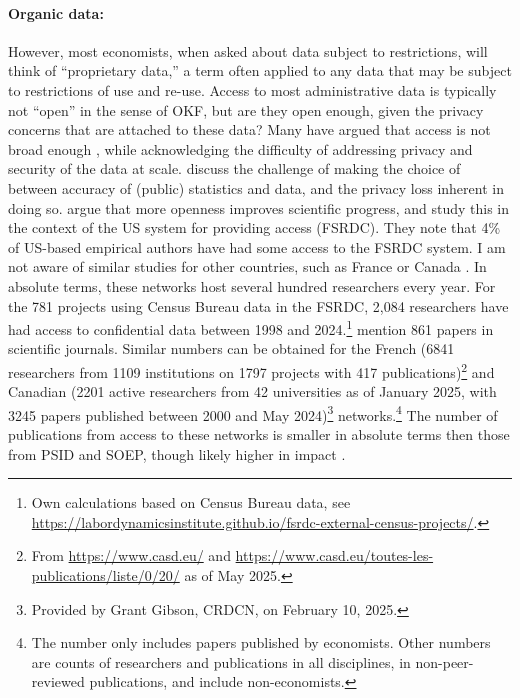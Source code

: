 \documentclass{article}
\begin{document}
\paragraph{Organic data:} However, most economists, when asked about data subject to restrictions, will think of ``proprietary data,'' a term often applied to any data that may be subject to restrictions of use and re-use. Access to most administrative data is typically not ``open'' in the sense of OKF, but are they open enough, given the privacy concerns that are attached to these data? Many have argued that access is not broad enough \citep{card_expanding_2010,einav_economics_2014}, while acknowledging the difficulty of addressing privacy and security of the data at scale. \citet{abowd_economic_2018} discuss the challenge of making the choice of between accuracy of (public) statistics and data, and the privacy loss inherent in doing so. \citet{nagaraj_improving_2020} argue that more openness improves scientific progress, and \citet{nagaraj_how_2023} study this in the context of the US system for providing access (\ac{FSRDC}). They note that 4\% of US-based empirical authors have had some access to the FSRDC system. I am not aware of similar studies for other countries, such as France \citep[the equivalent system is the \ac{CASD}, ][]{gadouche_centre_2019} or Canada \citep{currie2015social}. In absolute terms, these networks host several hundred researchers every year. For the 781 projects using Census Bureau data in the \ac{FSRDC}, 2,084 researchers  have had access to confidential data between 1998 and 2024.\footnote{Own calculations based on Census Bureau data, see \url{https://labordynamicsinstitute.github.io/fsrdc-external-census-projects/}.} \citet{nagaraj_how_2023} mention 861 papers in scientific journals. Similar numbers can be obtained for the French (6841 researchers from 1109 institutions on 1797 projects with 417 publications)\footnote{From \url{https://www.casd.eu/} and \url{https://www.casd.eu/toutes-les-publications/liste/0/20/} as of May 2025.}
and Canadian (2201 active researchers from 42 universities as of January 2025, with 3245 papers published between 2000 and May 2024)\footnote{Provided by Grant Gibson, CRDCN, on February 10, 2025.} networks.\footnote{The \citet{nagaraj_how_2023} number only includes papers published by economists. Other numbers are counts of researchers and publications in all disciplines, in non-peer-reviewed publications, and include non-economists.} The number of publications from access to these networks is smaller in absolute terms then those from PSID and SOEP, though likely higher in impact \citep{nagaraj_how_2023}.
\end{document}
